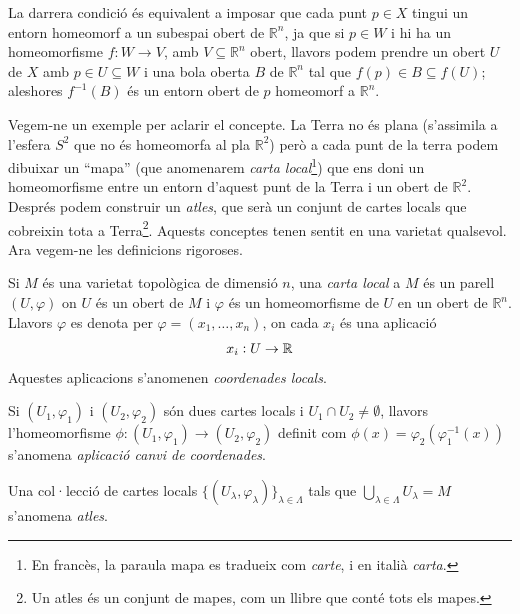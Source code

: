 \documentclass[../main.tex]{subfiles}
\begin{document}
La darrera condició és equivalent a imposar que cada punt $p\in X$ tingui un entorn homeomorf a un subespai obert de $\mathbb{R}^n$, ja que si $p\in W$ i hi ha un homeomorfisme $f:W\rightarrow V$, amb $V\subseteq \mathbb{R}^n$ obert, llavors podem prendre un obert $U$ de $X$ amb $p\in U\subseteq W$ i una bola oberta $B$ de $\mathbb{R}^n$ tal que $f(p)\in B\subseteq f(U)$; aleshores $f^{-1}(B)$ és un entorn obert de $p$ homeomorf a $\mathbb{R}^n$.

Vegem-ne un exemple per aclarir el concepte. La Terra no és plana (s'assimila a l'esfera $S^2$ que no és homeomorfa al pla $\mathbb{R}^2$) però a cada punt de la terra podem dibuixar un ``mapa'' (que anomenarem \textit{carta local}\footnote{En francès, la paraula mapa es tradueix com \textit{carte}, i en italià \textit{carta}.}) que ens doni un homeomorfisme entre un entorn d'aquest punt de la Terra i un obert de $\mathbb{R}^2$. Després podem construir un \textit{atles}, que serà un conjunt de cartes locals que cobreixin tota a Terra\footnote{Un atles és un conjunt de mapes, com un llibre que conté tots els mapes.}. Aquests conceptes tenen sentit en una varietat qualsevol. Ara vegem-ne les definicions rigoroses.

\begin{defi}
\label{def:cartalocal} Si $M$ és una varietat topològica de dimensió $n$, una \textit{carta local} a $M$ és un parell $(U,\varphi)$ on $U$ és un obert de $M$ i $\varphi$ és un homeomorfisme de $U$ en un obert de $\mathbb{R}^n$. Llavors $\varphi$ es denota per $\varphi=(x_1,\ldots,x_n)$, on cada $x_i$ és una aplicació 
\begin{equation}
    \notag
    x_i:U\rightarrow\mathbb{R}
\end{equation}
Aquestes aplicacions s'anomenen \textit{coordenades locals}.
\end{defi}

\begin{defi}
\label{def:canvidecoordenades} Si $(U_1,\varphi_1)$ i $(U_2,\varphi_2)$ són dues cartes locals i $U_1\cap U_2\not=\emptyset$, llavors l'homeomorfisme $\phi:(U_1,\varphi_1)\rightarrow (U_2,\varphi_2)$ definit com $\phi(x) = \varphi_2(\varphi_1^{-1}(x))$ s'anomena \textit{aplicació canvi de coordenades}.
\end{defi}

\begin{defi}
[Atles]\label{def:atles} Una col·lecció
de cartes locals $\{(U_\lambda,\varphi_\lambda)\}_{\lambda\in \Lambda}$ tals que $\bigcup_{\lambda\in \Lambda} U_\lambda = M$ s'anomena \textit{atles}.
\end{defi}
\end{document}
